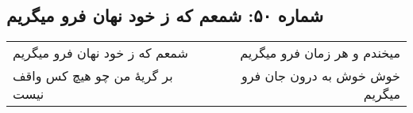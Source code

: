 \begin{center}
\section*{شماره ۵۰: شمعم که ز خود نهان فرو میگریم}
\label{sec:050}
\begin{longtable}{l p{0.5cm} r}
شمعم که ز خود نهان فرو میگریم
&&
میخندم و هر زمان فرو میگریم
\\
بر گریهٔ من چو هیچ کس واقف نیست
&&
خوش خوش به درون جان فرو میگریم
\\
\end{longtable}
\end{center}
